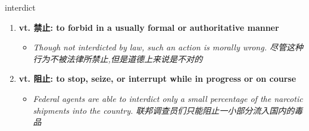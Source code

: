 
\begin{frame}
{\huge interdict}
\begin{center}
\begin{enumerate}\Large
  \item \textbf{vt. 禁止: to forbid in a usually formal or authoritative manner}
  \begin{itemize}
    \item \em{\Large{Though not interdicted by law, such an action is morally wrong. 尽管这种行为不被法律所禁止,但是道德上来说是不对的}}
  \end{itemize}
  \item \textbf{vt. 阻止: to stop, seize, or interrupt while in progress or on course}
  \begin{itemize}
    \item \em{\Large{Federal agents are able to interdict only a small percentage of the narcotic shipments into the country. 联邦调查员们只能阻止一小部分流入国内的毒品}}
  \end{itemize}
\end{enumerate}
\end{center}
\end{frame}
